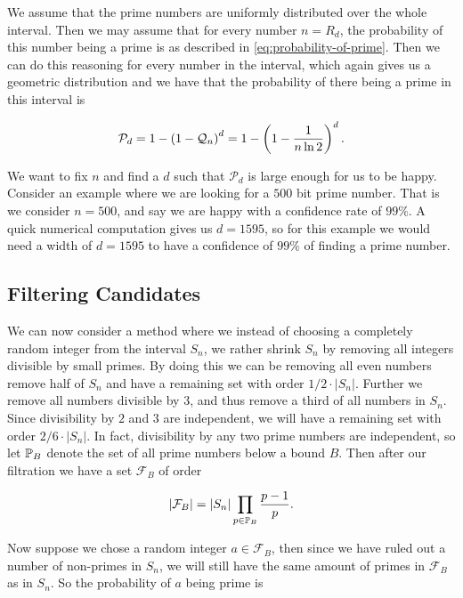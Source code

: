   We assume that the prime numbers are uniformly distributed over the whole interval.
  Then we may assume that for every number $n = R_d$, the probability of this number being a prime is as described in \eqref{eq:probability-of-prime}.
  Then we can do this reasoning for every number in the interval, which again gives us a geometric distribution and we have that the probability of there being a prime in this interval is

  \begin{equation}
    \mathcal{P}_d = 1 - \left(  1-\mathcal{Q}_n  \right)^{d} = 1 - \left(  1-\frac{1}{n \ln 2}  \right)^d.
    \label{eq:probability-of-prime-in-rd}
  \end{equation}

  We want to fix $n$ and find a $d$ such that $\mathcal{P}_d$ is large enough for us to be happy.
  Consider an example where we are looking for a $500$ bit prime number.
  That is we consider $n=500$, and say we are happy with a confidence rate of $99\%$.
  A quick numerical computation gives us $d = 1595$, so for this example we would need a width of $d = 1595$ to have a confidence of $99\%$ of finding a prime number.


\subsection{Filtering Candidates}

  We can now consider a method where we instead of choosing a completely random integer from the interval $S_n$, we rather shrink $S_n$ by removing all integers divisible by small primes.
  By doing this we can be removing all even numbers remove half of $S_n$ and have a remaining set with order $1/2 \cdot |S_n|$.
  Further we remove all numbers divisible by $3$, and thus remove a third of all numbers in $S_n$.
  Since divisibility by $2$ and $3$ are independent, we will have a remaining set with order $2/6 \cdot |S_n|$.
  In fact, divisibility by any two prime numbers are independent, so let $\mathbb{P}_B$ denote the set of all prime numbers below a bound $B$.
  Then after our filtration we have a set $\mathcal{F}_B$ of order

  \begin{equation}
    \left| \mathcal{F}_B \right| = \left|  S_n  \right| \prod_{p\in \mathbb{P}_B} \frac{p-1}{p}.
    \label{eq:order-after-filtration}
  \end{equation}

  Now suppose we chose a random integer $a \in \mathcal{F}_B$, then since we have ruled out a number of non-primes in $S_n$, we will still have the same amount of primes in $\mathcal{F}_B$ as in $S_n$.
  So the probability of $a$ being prime is

